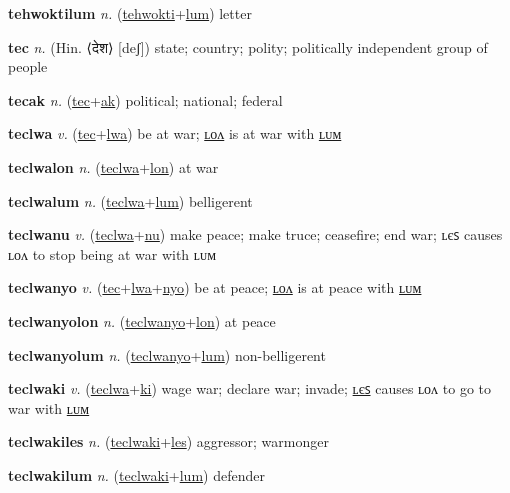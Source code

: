 \textbf{\hypertarget{tehwoktilum}{tehwoktilum}} \textit{n.} (\hyperlink{tehwokti}{tehwokti}+\allowbreak \hyperlink{lum}{lum})
letter

\textbf{\hypertarget{tec}{tec}} \textit{n.} (Hin. ⟨{\devanagari{}देश}⟩ [deʃ])
state; country; polity; politically independent group of people

\textbf{\hypertarget{tecak}{tecak}} \textit{n.} (\hyperlink{tec}{tec}+\allowbreak \hyperlink{ak}{ak})
political; national; federal

\textbf{\hypertarget{teclwa}{teclwa}} \textit{v.} (\hyperlink{tec}{tec}+\allowbreak \hyperlink{lwa}{lwa})
be at war; \hyperlink{teclwalon}{ʟᴏᴧ} is at war with \hyperlink{teclwalum}{ʟᴜᴍ}

\textbf{\hypertarget{teclwalon}{teclwalon}} \textit{n.} (\hyperlink{teclwa}{teclwa}+\allowbreak \hyperlink{lon}{lon})
at war

\textbf{\hypertarget{teclwalum}{teclwalum}} \textit{n.} (\hyperlink{teclwa}{teclwa}+\allowbreak \hyperlink{lum}{lum})
belligerent

\textbf{\hypertarget{teclwanu}{teclwanu}} \textit{v.} (\hyperlink{teclwa}{teclwa}+\allowbreak \hyperlink{nu}{nu})
make peace; make truce; ceasefire; end war; ʟєꜱ causes ʟᴏᴧ to stop being at war with ʟᴜᴍ

\textbf{\hypertarget{teclwanyo}{teclwanyo}} \textit{v.} (\hyperlink{tec}{tec}+\allowbreak \hyperlink{lwa}{lwa}+\allowbreak \hyperlink{nyo}{nyo})
be at peace; \hyperlink{teclwanyolon}{ʟᴏᴧ} is at peace with \hyperlink{teclwanyolum}{ʟᴜᴍ}

\textbf{\hypertarget{teclwanyolon}{teclwanyolon}} \textit{n.} (\hyperlink{teclwanyo}{teclwanyo}+\allowbreak \hyperlink{lon}{lon})
at peace

\textbf{\hypertarget{teclwanyolum}{teclwanyolum}} \textit{n.} (\hyperlink{teclwanyo}{teclwanyo}+\allowbreak \hyperlink{lum}{lum})
non-belligerent

\textbf{\hypertarget{teclwaki}{teclwaki}} \textit{v.} (\hyperlink{teclwa}{teclwa}+\allowbreak \hyperlink{ki}{ki})
wage war; declare war; invade; \hyperlink{teclwakiles}{ʟєꜱ} causes ʟᴏᴧ to go to war with \hyperlink{teclwakilum}{ʟᴜᴍ}

\textbf{\hypertarget{teclwakiles}{teclwakiles}} \textit{n.} (\hyperlink{teclwaki}{teclwaki}+\allowbreak \hyperlink{les}{les})
aggressor; warmonger

\textbf{\hypertarget{teclwakilum}{teclwakilum}} \textit{n.} (\hyperlink{teclwaki}{teclwaki}+\allowbreak \hyperlink{lum}{lum})
defender

